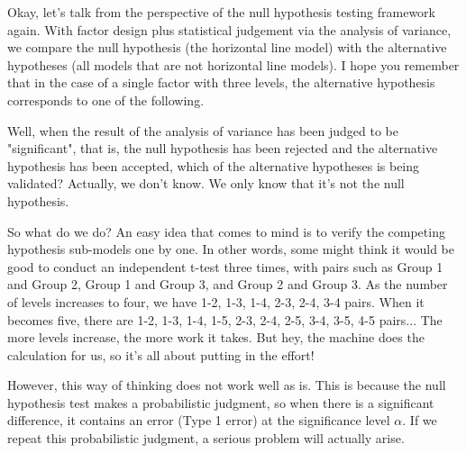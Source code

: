 \documentclass{ltjsarticle}
\begin{document}
Okay, let's talk from the perspective of the null hypothesis testing framework again. With factor design plus statistical judgement via the analysis of variance, we compare the null hypothesis (the horizontal line model) with the alternative hypotheses (all models that are not horizontal line models). I hope you remember that in the case of a single factor with three levels, the alternative hypothesis corresponds to one of the following.

Well, when the result of the analysis of variance has been judged to be "significant", that is, the null hypothesis has been rejected and the alternative hypothesis has been accepted, which of the alternative hypotheses is being validated? Actually, we don't know. We only know that it's not the null hypothesis.

So what do we do?
An easy idea that comes to mind is to verify the competing hypothesis sub-models one by one. In other words, some might think it would be good to conduct an independent t-test three times, with pairs such as Group 1 and Group 2, Group 1 and Group 3, and Group 2 and Group 3.
As the number of levels increases to four, we have 1-2, 1-3, 1-4, 2-3, 2-4, 3-4 pairs. When it becomes five, there are 1-2, 1-3, 1-4, 1-5, 2-3, 2-4, 2-5, 3-4, 3-5, 4-5 pairs... The more levels increase, the more work it takes. But hey, the machine does the calculation for us, so it's all about putting in the effort!

However, this way of thinking does not work well as is. This is because the null hypothesis test makes a probabilistic judgment, so when there is a significant difference, it contains an error (Type 1 error) at the significance level $\alpha$. If we repeat this probabilistic judgment, a serious problem will actually arise.
\end{document}
